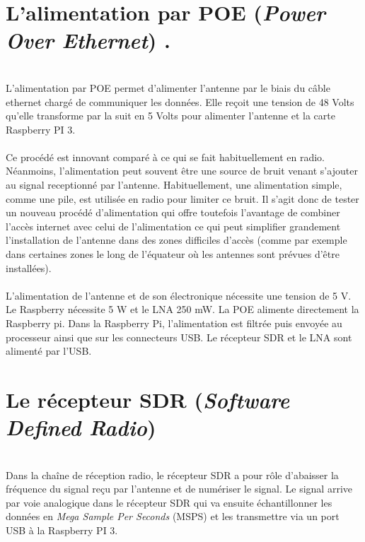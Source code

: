 \documentclass[12pt,fleqn]{book} %
\begin{document}
\section{L'alimentation par POE (\emph{Power Over Ethernet}) .}
~\\\indent L'alimentation par POE permet d'alimenter l'antenne par le biais du câble ethernet chargé de communiquer les données. Elle reçoit une tension de 48 Volts qu'elle transforme par la suit en 5 Volts pour alimenter l'antenne et la carte Raspberry PI 3.
~\\\\Ce procédé est innovant comparé à ce qui se fait habituellement en radio. Néanmoins, l'alimentation peut souvent être une source de bruit venant s'ajouter au signal receptionné par l'antenne. Habituellement, une alimentation simple, comme une pile, est utilisée en radio pour limiter ce bruit. Il s'agit donc de tester un nouveau procédé d'alimentation qui offre toutefois l'avantage de combiner l'accès internet avec celui de l'alimentation ce qui peut simplifier grandement l'installation  
de l'antenne dans des zones difficiles d'accès (comme par exemple dans certaines zones le long de l'équateur où les antennes sont prévues d'être installées).
~\\\\L’alimentation de l’antenne et de son électronique nécessite une tension de 5 V. Le Raspberry nécessite 5 W et le LNA 250 mW. La POE alimente directement la Raspberry pi. Dans la Raspberry Pi, l’alimentation est filtrée puis envoyée au processeur ainsi que sur les connecteurs USB. Le récepteur SDR et le LNA sont alimenté par l’USB.
\section{Le récepteur SDR (\emph{Software Defined Radio})}
~\\\indent Dans la chaîne de réception radio, le récepteur SDR a pour rôle d'abaisser la fréquence du signal reçu par l'antenne et de numériser le signal. Le signal arrive par voie analogique dans le récepteur SDR qui va ensuite échantillonner les données en \emph{Mega Sample Per Seconds} (MSPS) et les transmettre via un port USB à la Raspberry PI 3.
\end{document}
